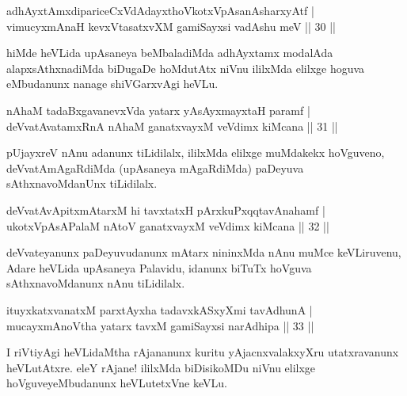 
\begin{shl}
adhAyxtAmxdipariceCxVdAdayxthoVkotxVpAsanAsharxyAtf |\\
vimucyxmAnaH kevxVtasatxvXM gamiSayxsi vadA\s \s shu meV \hfill || 30 || 
\end{shl}

\begin{artha}
hiMde heVLida upAsaneya beMbaladiMda adhAyxtamx modalAda alapxsAthxnadiMda biDugaDe hoMdutAtx niVnu ililxMda elilxge hoguva eMbudanunx nanage shiVGarxvAgi heVLu.
\end{artha}


\begin{shl}
nAhaM tadaBxgavanevxVda yatarx yAsAyxmayxtaH paramf |\\
deVvatAvatamxRnA nAhaM ganatxvayxM veVdimx kiMcana \hfill || 31 || 
\end{shl}

\begin{artha}
pUjayxreV nAnu adanunx tiLidilalx, ililxMda elilxge muMdakekx hoVguveno, deVvatAmAgaRdiMda (upAsaneya mAgaRdiMda) paDeyuva sAthxnavoMdanUnx tiLidilalx.
\end{artha}

\begin{shl}
deVvatAvApitxmAtarxM hi tavxtatxH pArxkuPxqqtavAnahamf |\\
ukotxVpAsAPalaM nAtoV ganatxvayxM veVdimx kiMcana \hfill || 32 || 
\end{shl}

\begin{artha}
deVvateyanunx paDeyuvudanunx mAtarx nininxMda nAnu muMce keVLiruvenu, Adare heVLida upAsaneya Palavidu, idanunx biTuTx hoVguva sAthxnavoMdanunx nAnu tiLidilalx.
\end{artha}


\begin{shl}
ituyxkatxvanatxM parxtAyxha tadavxkASxyXmi tavAdhunA |\\
mucayxmAnoV\s tha yatarx tavxM gamiSayxsi narAdhipa \hfill || 33 || 
\end{shl}

\begin{artha}
I riVtiyAgi heVLidaMtha rAjananunx kuritu yAjacnxvalakxyXru utatxravanunx heVLutAtxre. eleY rAjane! ililxMda biDisikoMDu niVnu elilxge hoVguveyeMbudanunx heVLutetxVne keVLu.
\end{artha}

